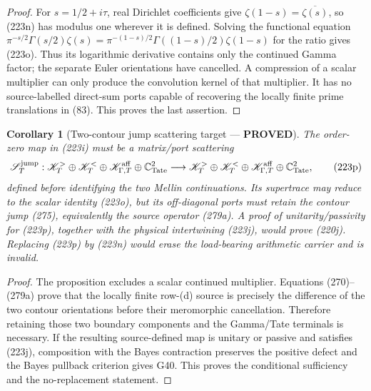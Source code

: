 \documentclass[11pt]{article}
\newtheorem{corollary}[theorem]{Corollary}
\newcommand{\PROVED}{\textcolor{green!45!black}{\textbf{PROVED}}}
\begin{document}
\begin{proof}
For $s=1/2+i\tau$, real Dirichlet coefficients give
$\zeta(1-s)=\overline{\zeta(s)}$, so (223n) has modulus one wherever it is
defined.  Solving the functional equation
$\pi^{-s/2}\Gamma(s/2)\zeta(s)
=\pi^{-(1-s)/2}\Gamma((1-s)/2)\zeta(1-s)$
for the ratio gives (223o).  Thus its logarithmic derivative contains only
the continued Gamma factor; the separate Euler orientations have cancelled.
A compression of a scalar multiplier can only produce the convolution kernel
of that multiplier.  It has no source-labelled direct-sum ports capable of
recovering the locally finite prime translations in (83).  This proves the
last assertion.
\end{proof}

\begin{corollary}[Two-contour jump scattering target --- \PROVED]
The order-zero map in (223i) must be a matrix/port scattering
\begin{equation}
 \mathscr S_T^{\rm jump}:
 \mathscr K_T^{>}\oplus\mathscr K_T^{<}\oplus
       \mathscr K_{\Gamma,T}^{\rm aff}\oplus\mathbb C^2_{\rm Tate}
 \longrightarrow
 \mathscr K_T^{>}\oplus\mathscr K_T^{<}\oplus
       \mathscr K_{\Gamma,T}^{\rm aff}\oplus\mathbb C^2_{\rm Tate},
                                                               \tag{223p}
\end{equation}
defined before identifying the two Mellin continuations.  Its supertrace may
reduce to the scalar identity (223o), but its off-diagonal ports must retain
the contour jump (275), equivalently the source operator (279a).  A proof of
unitarity/passivity for (223p), together with the physical intertwining
(223j), would prove (220j).  Replacing (223p) by (223n) would erase the
load-bearing arithmetic carrier and is invalid.
\end{corollary}

\begin{proof}
The proposition excludes a scalar continued multiplier.  Equations
(270)--(279a) prove that the locally finite row-(d) source is precisely the
difference of the two contour orientations before their meromorphic
cancellation.  Therefore retaining those two boundary components and the
Gamma/Tate terminals is necessary.  If the resulting source-defined map is
unitary or passive and satisfies (223j), composition with the Bayes
contraction preserves the positive defect and the Bayes pullback criterion
gives G40.  This proves the conditional sufficiency and the no-replacement
statement.
\end{proof}
\end{document}
